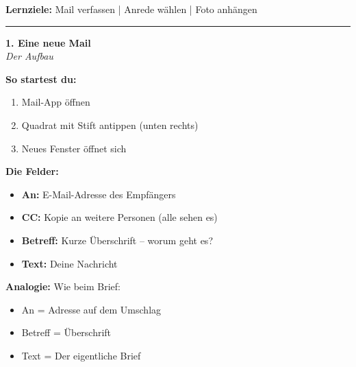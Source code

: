 \documentclass[a4paper,landscape,8pt]{extarticle}
\begin{document}

 \hfill
{\footnotesize\textbf{Lernziele:} Mail verfassen | Anrede wählen | Foto anhängen}

\vspace{1mm}
\hrule
\vspace{1mm}

\begin{minipage}[t]{0.32\linewidth}
\begin{center}
\colorbox{mailblue!10}{%
\begin{minipage}{0.95\linewidth}
\vspace{2mm}
\begin{center}
{\Large\bfseries\textcolor{mailblue}{1. Eine neue Mail}}\\[1pt]
{\footnotesize\itshape Der Aufbau}
\end{center}
\vspace{2mm}
\end{minipage}%
}
\end{center}

\vspace{1mm}

\textbf{So startest du:}
\begin{enumerate}
\item Mail-App öffnen
\item Quadrat mit Stift antippen (unten rechts)
\item Neues Fenster öffnet sich
\end{enumerate}

\textbf{Die Felder:}
\begin{itemize}
\item \textbf{An:} E-Mail-Adresse des Empfängers
\item \textbf{CC:} Kopie an weitere Personen (alle sehen es)
\item \textbf{Betreff:} Kurze Überschrift -- worum geht es?
\item \textbf{Text:} Deine Nachricht
\end{itemize}

\textbf{Analogie:} Wie beim Brief:
\begin{itemize}
\item An = Adresse auf dem Umschlag
\item Betreff = Überschrift
\item Text = Der eigentliche Brief
\end{itemize}

\end{minipage}%
\end{document}
